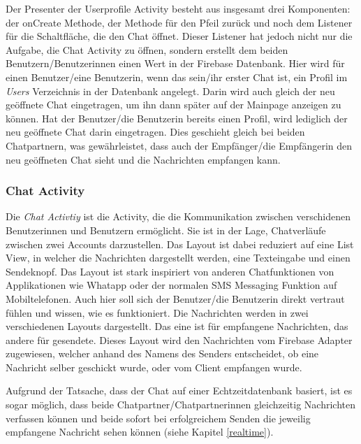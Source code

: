 \documentclass[a4paper,11pt]{report}
\begin{document}
				Der Presenter der Userprofile Activity besteht aus insgesamt drei Komponenten: der onCreate Methode, der Methode für den Pfeil zurück und noch dem Listener für die Schaltfläche, die den Chat öffnet. Dieser Listener hat jedoch nicht nur die Aufgabe, die Chat Activity zu öffnen, sondern erstellt dem beiden Benutzern/Benutzerinnen einen Wert in der Firebase Datenbank. Hier wird für einen Benutzer/eine Benutzerin, wenn das sein/ihr erster Chat ist, ein Profil im \emph{Users} Verzeichnis in der Datenbank angelegt. Darin wird auch gleich der neu geöffnete Chat eingetragen, um ihn dann später auf der Mainpage anzeigen zu können. Hat der Benutzer/die Benutzerin bereits einen Profil, wird lediglich der neu geöffnete Chat darin eingetragen. Dies geschieht gleich bei beiden Chatpartnern, was gewährleistet, dass auch der Empfänger/die Empfängerin den neu geöffneten Chat sieht und die Nachrichten empfangen kann.
				
				\subsubsection{Chat Activity} \label{chat:act}
				Die \emph{Chat Activtiy} ist die Activity, die die Kommunikation zwischen verschidenen Benutzerinnen und Benutzern ermöglicht. Sie ist in der Lage, Chatverläufe zwischen zwei Accounts darzustellen. Das Layout ist dabei reduziert auf eine List View, in welcher die Nachrichten dargestellt werden, eine Texteingabe und einen Sendeknopf. Das Layout ist stark inspiriert von anderen Chatfunktionen von Applikationen wie Whatapp oder der normalen SMS Messaging Funktion auf Mobiltelefonen. Auch hier soll sich der Benutzer/die Benutzerin direkt vertraut fühlen und wissen, wie es funktioniert. Die Nachrichten werden in zwei verschiedenen Layouts dargestellt. Das eine ist für empfangene Nachrichten, das andere für gesendete. Dieses Layout wird den Nachrichten vom Firebase Adapter zugewiesen, welcher anhand des Namens des Senders entscheidet, ob eine Nachricht selber geschickt wurde, oder vom Client empfangen wurde.
				
				Aufgrund der Tatsache, dass der Chat auf einer Echtzeitdatenbank basiert, ist es sogar möglich, dass beide Chatpartner/Chatpartnerinnen gleichzeitig Nachrichten verfassen können und beide sofort bei erfolgreichem Senden die jeweilig empfangene Nachricht sehen können (siehe Kapitel \ref{realtime}).
				
\end{document}
